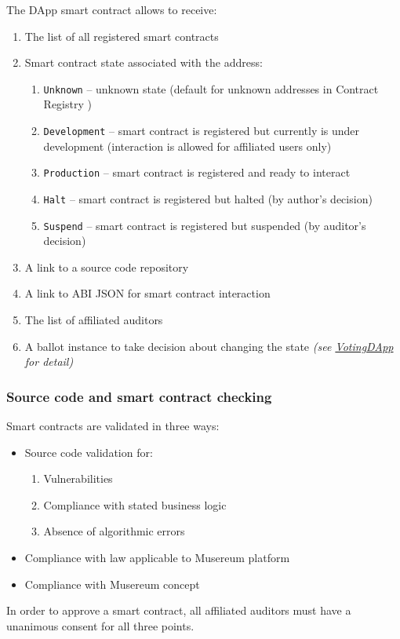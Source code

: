 \documentclass[12pt]{report}
\newcommand{\hlc}[1]{\colorbox{white!25}{#1}}
\def\code#1{\colorbox{light-gray}{\texttt{#1}}}
\begin{document}
The DApp smart contract allows to receive:
\begin{enumerate}
	\item The list of all registered smart contracts
	\item Smart contract state associated with the address:
	\begin{enumerate}
		\item \code{Unknown} – unknown state (default for unknown addresses in \hlc{Contract Registry })
		\item \code{Development} – smart contract is registered but currently is under development (interaction is allowed for affiliated users only)
		\item \code{Production} – smart contract is registered and \hlc{ready to interact}
		\item \code{Halt} – smart contract is registered but halted (by author's decision)
		\item \code{Suspend} – smart contract is registered but suspended (by auditor's decision)
	\end{enumerate}
\item A link to a source code repository
\item A link to ABI JSON for smart contract interaction
\item The list of affiliated auditors
\item A ballot \hlc{instance} to take decision about changing the state \textit{(see \hyperref[tech-apps-voting]{VotingDApp} for detail)}
\end{enumerate}
\subsubsection{Source code and smart contract checking}
\label{tech-apps-contracts-validate}
Smart contracts are validated in three ways:
\begin{itemize}
	\item Source code validation for:
		\begin{enumerate}
			\item Vulnerabilities 
			\item Compliance with stated business logic
			\item Absence of algorithmic errors
		\end{enumerate}
	\item Compliance with law applicable to Musereum platform
	\item Compliance with Musereum concept
\end{itemize}
In order to approve a smart contract, all affiliated auditors must have a unanimous consent for all three points.
\end{document}
